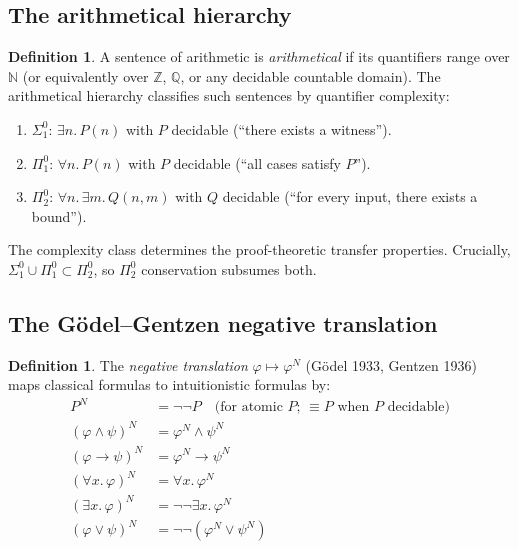 \documentclass[11pt,a4paper]{article}
\theoremstyle{plain}
\theoremstyle{definition}
\newtheorem{definition}[theorem]{Definition}
\newcommand{\Z}{\mathbb{Z}}
\newcommand{\Q}{\mathbb{Q}}
\newcommand{\N}{\mathbb{N}}
\begin{document}
\subsection{The arithmetical hierarchy}

\begin{definition}\label{def:arith-hierarchy}
A sentence of arithmetic is \emph{arithmetical} if its quantifiers range over $\N$ (or equivalently over $\Z$, $\Q$, or any decidable countable domain).  The arithmetical hierarchy classifies such sentences by quantifier complexity:
\begin{enumerate}[label=(\alph*)]
\item $\Sigma^0_1$: $\exists n.\, P(n)$ with $P$ decidable (``there exists a witness'').
\item $\Pi^0_1$: $\forall n.\, P(n)$ with $P$ decidable (``all cases satisfy $P$'').
\item $\Pi^0_2$: $\forall n.\, \exists m.\, Q(n,m)$ with $Q$ decidable (``for every input, there exists a bound'').
\end{enumerate}
\end{definition}

The complexity class determines the proof-theoretic transfer properties.  Crucially, $\Sigma^0_1 \cup \Pi^0_1 \subset \Pi^0_2$, so $\Pi^0_2$ conservation subsumes both.

\subsection{The G\"odel--Gentzen negative translation}

\begin{definition}\label{def:neg-translation}
The \emph{negative translation} $\varphi \mapsto \varphi^N$ (G\"odel 1933, Gentzen 1936) maps classical formulas to intuitionistic formulas by:
\begin{align*}
P^N &= \lnot\lnot P \quad \text{(for atomic $P$; $\equiv P$ when $P$ decidable)} \\
(\varphi \land \psi)^N &= \varphi^N \land \psi^N \\
(\varphi \to \psi)^N &= \varphi^N \to \psi^N \\
(\forall x.\, \varphi)^N &= \forall x.\, \varphi^N \\
(\exists x.\, \varphi)^N &= \lnot\lnot \exists x.\, \varphi^N \\
(\varphi \lor \psi)^N &= \lnot\lnot(\varphi^N \lor \psi^N)
\end{align*}
\end{definition}
\end{document}
